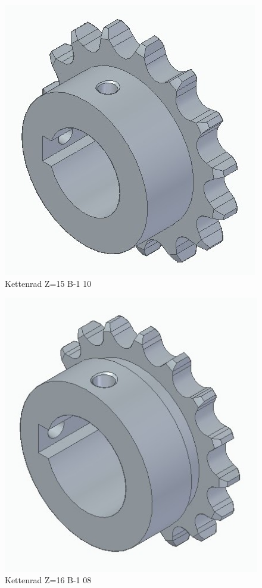 \begin{figure} [H]
	\begin{center}
		\includegraphics[scale=0.3]{figures/mechanik/10681532.jpg}
			\caption{Kettenrad Z=15 B-1 10}
			\label{fig:Kettenrad Z=15 B-1 10}
	\end{center}
\end{figure}


\begin{figure} [H]
	\begin{center}
		\includegraphics[scale=0.3]{figures/mechanik/10581632.jpg}
			\caption{Kettenrad Z=16 B-1 08}
			\label{fig:Kettenrad Z=16 B-1 08}
	\end{center}
\end{figure}


